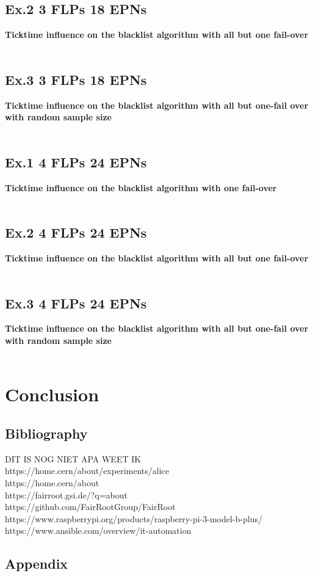 \documentclass{report}
\begin{document}
\section{Ex.2 3 FLPs 18 EPNs}
\textbf{Ticktime influence on the blacklist algorithm with all but one fail-over}
\\\\

\section{Ex.3 3 FLPs 18 EPNs}
\textbf{Ticktime influence on the blacklist algorithm with all but one-fail over with random sample size}
\\\\

\section{Ex.1 4 FLPs 24 EPNs}
\textbf{Ticktime influence on the blacklist algorithm with one fail-over}
\\\\

\section{Ex.2 4 FLPs 24 EPNs}
\textbf{Ticktime influence on the blacklist algorithm with all but one fail-over}
\\\\

\section{Ex.3 4 FLPs 24 EPNs}
\textbf{Ticktime influence on the blacklist algorithm with all but one-fail over with random sample size}
\\\\

\chapter{Conclusion}

\section*{Bibliography}
DIT IS NOG NIET APA WEET IK\\
https://home.cern/about/experiments/alice\\
https://home.cern/about\\
https://fairroot.gsi.de/?q=about\\
https://github.com/FairRootGroup/FairRoot\\
https://www.raspberrypi.org/products/raspberry-pi-3-model-b-plus/\\
https://www.ansible.com/overview/it-automation\\


\section{Appendix}
\end{document}
